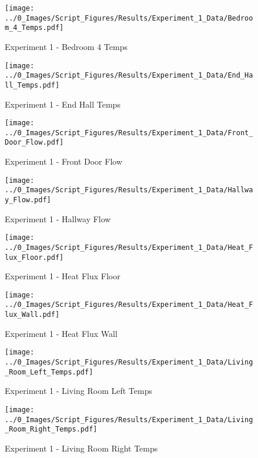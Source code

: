 	\begin{figure}[H]
		\centering
		\texttt{[image: ../0\_Images/Script\_Figures/Results/Experiment\_1\_Data/Bedroom\_4\_Temps.pdf]}
		\caption[]{Experiment 1 - Bedroom 4 Temps}
	\end{figure}
 
	\clearpage

	\begin{figure}[H]
		\centering
		\texttt{[image: ../0\_Images/Script\_Figures/Results/Experiment\_1\_Data/End\_Hall\_Temps.pdf]}
		\caption[]{Experiment 1 - End Hall Temps}
	\end{figure}
 

	\begin{figure}[H]
		\centering
		\texttt{[image: ../0\_Images/Script\_Figures/Results/Experiment\_1\_Data/Front\_Door\_Flow.pdf]}
		\caption[]{Experiment 1 - Front Door Flow}
	\end{figure}
 
	\clearpage

	\begin{figure}[H]
		\centering
		\texttt{[image: ../0\_Images/Script\_Figures/Results/Experiment\_1\_Data/Hallway\_Flow.pdf]}
		\caption[]{Experiment 1 - Hallway Flow}
	\end{figure}
 

	\begin{figure}[H]
		\centering
		\texttt{[image: ../0\_Images/Script\_Figures/Results/Experiment\_1\_Data/Heat\_Flux\_Floor.pdf]}
		\caption[]{Experiment 1 - Heat Flux Floor}
	\end{figure}
 
	\clearpage

	\begin{figure}[H]
		\centering
		\texttt{[image: ../0\_Images/Script\_Figures/Results/Experiment\_1\_Data/Heat\_Flux\_Wall.pdf]}
		\caption[]{Experiment 1 - Heat Flux Wall}
	\end{figure}
 

	\begin{figure}[H]
		\centering
		\texttt{[image: ../0\_Images/Script\_Figures/Results/Experiment\_1\_Data/Living\_Room\_Left\_Temps.pdf]}
		\caption[]{Experiment 1 - Living Room Left Temps}
	\end{figure}
 
	\clearpage

	\begin{figure}[H]
		\centering
		\texttt{[image: ../0\_Images/Script\_Figures/Results/Experiment\_1\_Data/Living\_Room\_Right\_Temps.pdf]}
		\caption[]{Experiment 1 - Living Room Right Temps}
	\end{figure}
 

